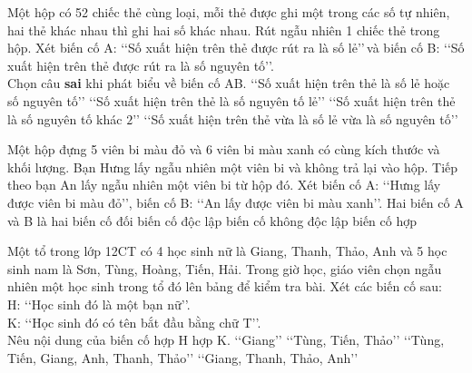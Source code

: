 \begin{ex}%
	Một hộp có 52 chiếc thẻ cùng loại, mỗi thẻ được ghi một trong các số tự nhiên, hai thẻ khác nhau thì ghi hai số khác nhau. Rút ngẫu nhiên 1 chiếc thẻ trong hộp. Xét biến cố A: \lq\lq Số xuất hiện trên thẻ được rút ra là số lẻ\rq\rq\,và biến cố B: \lq\lq Số xuất hiện trên thẻ được rút ra là số nguyên tố\rq\rq.\\
	Chọn câu \textbf{sai} khi phát biểu về biến cố AB. 
	\choice
	{\True \lq\lq Số xuất hiện trên thẻ là số lẻ hoặc số nguyên tố\rq\rq}
	{\lq\lq Số xuất hiện trên thẻ là số nguyên tố lẻ\rq\rq }
	{\lq\lq Số xuất hiện trên thẻ là số nguyên tố khác $2$\rq\rq }
	{\lq\lq Số xuất hiện trên thẻ vừa là số lẻ vừa là số nguyên tố\rq\rq}
\end{ex}
\begin{ex}%
	Một hộp đựng 5 viên bi màu đỏ và 6 viên bi màu xanh có cùng kích thước và khối lượng. Bạn Hưng lấy ngẫu nhiên một viên bi và không trả lại vào hộp. Tiếp theo bạn An lấy ngẫu nhiên một viên bi từ hộp đó. Xét biến cố A: \lq\lq Hưng lấy được viên bi màu đỏ\rq\rq , biến cố B: \lq\lq An lấy được viên bi màu xanh\rq\rq . Hai biến cố A và B là hai  
	\choice
	{biến cố đối}
	{biến cố độc lập}
	{\True biến cố không độc lập}
	{biến cố hợp}
\end{ex}
\begin{ex}%
	Một tổ trong lớp 12CT có 4 học sinh nữ là Giang, Thanh, Thảo, Anh và 5 học sinh nam là Sơn, Tùng, Hoàng, Tiến, Hải. Trong giờ học, giáo viên chọn ngẫu nhiên một học sinh trong tổ đó lên bảng để kiểm tra bài. Xét các biến cố sau:\\
	H: \lq\lq Học sinh đó là một bạn nữ\rq\rq .\\
	K: \lq\lq Học sinh đó có tên bắt đầu bằng chữ T\rq\rq .\\
	Nêu nội dung của biến cố hợp H hợp K.
	\choice
	{\lq\lq Giang\rq\rq}
	{\lq\lq Tùng, Tiến, Thảo\rq\rq}
	{\True \lq\lq Tùng, Tiến, Giang, Anh, Thanh, Thảo\rq\rq}
	{\lq\lq Giang, Thanh, Thảo, Anh\rq\rq}
\end{ex}


